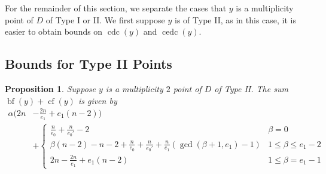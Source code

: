 \documentclass[12pt]{amsart}
\numberwithin{equation}{section}
\newtheorem{prop}[equation]{Proposition}
\theoremstyle{definition}
\newcommand{\tx}[1]{\text{#1}}
\DeclareMathOperator{\blf}{bf}
\DeclareMathOperator{\cf}{cf}
\DeclareMathOperator{\cdc}{cdc}
\DeclareMathOperator{\cedc}{cedc}
\begin{document}

For the remainder of this section, we separate the cases that $y$ is a multiplicity point of $D$ of Type I or II. We first suppose $y$ is of Type II, as in this case, it is easier to obtain bounds on $\cdc(y)$ and $\cedc(y)$.

\subsection{Bounds for Type II Points}

\begin{prop}\label{prop: cdc for type II}
    Suppose $y$ is a multiplicity $2$ point of $D$ of Type II. The sum $\blf(y)+\cf(y)$ is given by
    \begin{align*}
        \alpha(2n&-\frac{2n}{e_1}+e_1(n-2))\\
        &+ \begin{cases}
        \frac{n}{e_0}+\frac{n}{e_0'}-2&\beta=0\\
        \beta(n-2)-n-2+\frac{n}{e_0}+\frac{n}{e_0'}+\frac{n}{e_1}(\gcd(\beta+1,e_1)-1)&1\leq \beta\leq e_1-2\\
        2n-\frac{2n}{e_1}+e_1(n-2)&1\leq\beta=e_1-1
        \end{cases}
    \end{align*}
\end{prop}
\end{document}
